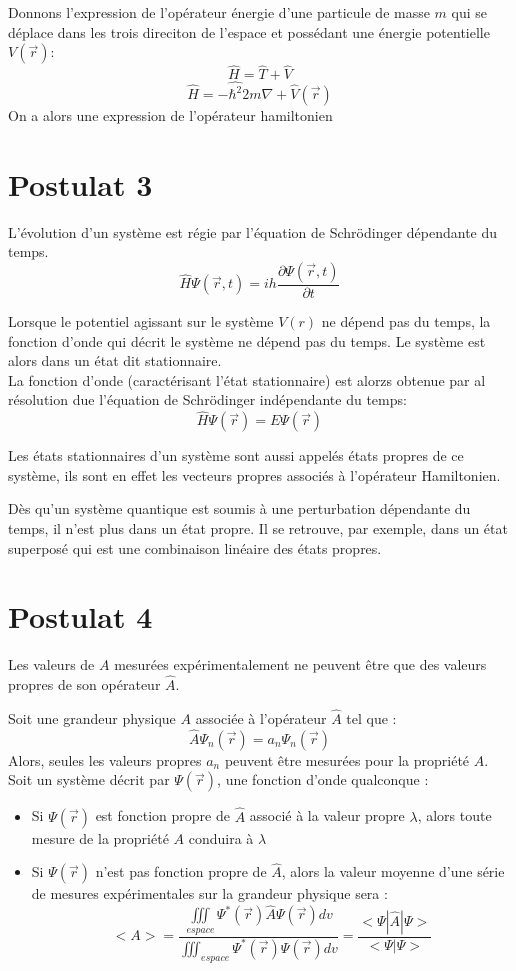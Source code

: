 \documentclass[../main.tex]{subfile}
\begin{document}
\begin{ex}
	Donnons l'expression de l'opérateur énergie d'une particule de masse $m$ qui se déplace dans les trois direciton de l'espace et possédant une énergie potentielle $V(\vec{r})$:
	$$\hat{H} = \hat{T} + \hat{V}$$
	$$\hat{H} = -\hat{\hbar^2}{2m}\nabla + \hat{V}(\vec{r})$$
	On a alors une expression de l'opérateur hamiltonien
\end{ex}



\section{Postulat 3}

L'évolution d'un système est régie par l'équation de Schrödinger dépendante du temps.
$$\hat{H} \Psi(\vec{r}, t) = ih\frac{\partial \Psi(\vec{r}, t)}{\partial t}$$

Lorsque le potentiel agissant sur le système $V(r)$ ne dépend pas du temps, la fonction d'onde qui décrit le système ne dépend pas du temps. Le système est alors dans un état dit stationnaire.\\
La fonction d'onde (caractérisant l'état stationnaire) est alorzs obtenue par al résolution due l'équation de Schrödinger indépendante du temps:
$$\hat{H} \Psi(\vec{r}) = E\Psi(\vec{r})$$

Les états stationnaires d'un système sont aussi appelés états propres de ce système, ils sont en effet les vecteurs propres associés à l'opérateur Hamiltonien.

Dès qu'un système quantique est soumis à une perturbation dépendante du temps, il n'est plus dans un état propre. Il se retrouve, par exemple, dans un état superposé qui est une combinaison linéaire des états propres.

\section{Postulat 4}
Les valeurs de $A$ mesurées expérimentalement ne peuvent être que des valeurs propres de son opérateur $\hat{A}$.

Soit une grandeur physique $A$ associée à l'opérateur $\hat{A}$ tel que :
$$\hat{A} \Psi_n(\vec{r}) = a_n\Psi_n(\vec{r})$$
Alors, seules les valeurs propres $a_n$ peuvent être mesurées pour la propriété $A$.\\

Soit un système décrit par $\Psi(\vec{r})$, une fonction d'onde qualconque : \\
\begin{itemize}
	\item Si $\Psi(\vec{r})$ est fonction propre de $\hat{A}$ associé à la valeur propre $\lambda$, alors toute mesure de la propriété $A$ conduira à $\lambda$
	\item Si $\Psi(\vec{r})$ n'est pas fonction propre de $\hat{A}$, alors la valeur moyenne d'une série de mesures expérimentales sur la grandeur physique sera :
	$$<A> = \frac{\iiint\limits_{espace} \Psi^*(\vec{r})\hat{A}\Psi(\vec{r})dv}{\iiint_{espace} \Psi^*(\vec{r}) \Psi(\vec{r}) dv} = \frac{<\Psi | \hat{A} | \Psi >}{<\Psi | \Psi>}$$
\end{itemize}
\end{document}
